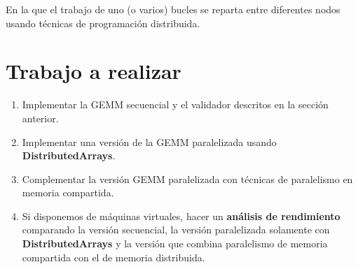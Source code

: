 \documentclass[a4paper]{article}
\begin{document}
En la que el trabajo de uno (o varios) bucles se reparta entre diferentes nodos usando técnicas
de programación distribuida.

\section{Trabajo a realizar}
\label{sec:org4643540}

\begin{enumerate}
\item Implementar la GEMM secuencial y el validador descritos en la sección anterior.
\item Implementar una versión de la GEMM paralelizada usando \textbf{DistributedArrays}.
\item Complementar la versión GEMM paralelizada con técnicas de paralelismo en memoria compartida.
\item Si disponemos de máquinas virtuales, hacer un \textbf{análisis de rendimiento} comparando la versión secuencial,
la versión paralelizada solamente con \textbf{DistributedArrays} y la versión que combina paralelismo de memoria
compartida con el de memoria distribuida.
\end{enumerate}
\end{document}
